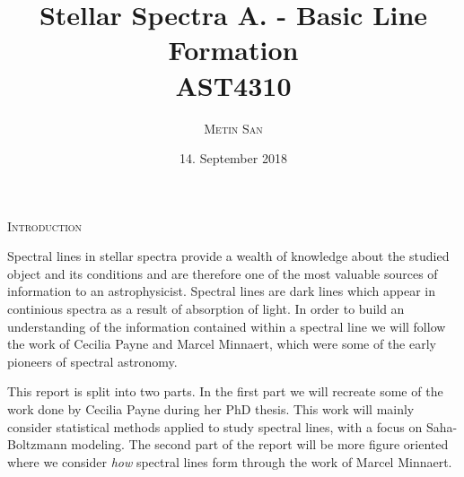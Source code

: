 \documentclass[a4paper,11.5pt,]{article}
\title{Stellar Spectra A. - Basic Line Formation\\
 AST4310}
\date{\normalsize{14. September 2018} }
\author{\textsc{\small{Metin San}}}
\begin{document}
\maketitle
\begin{center}
\textsc{Introduction}
\end{center}


\begin{adjustwidth}{1cm}{1cm}

Spectral lines in stellar spectra provide a wealth of knowledge about the studied object and its conditions and are therefore one of the most valuable sources of information to an astrophysicist. Spectral lines are dark lines which appear in continious spectra as a result of absorption of light. In order to build an understanding of the information contained within a spectral line we will follow the work of Cecilia Payne and Marcel Minnaert, which were some of the early pioneers of spectral astronomy. 

This report is split into two parts. In the first part we will recreate some of the work done by Cecilia Payne during her PhD thesis. This work will mainly consider statistical methods applied to study spectral lines, with a focus on Saha-Boltzmann modeling. The second part of the report will be more figure oriented where we consider \textit{how} spectral lines form through the work of Marcel Minnaert.
\end{adjustwidth}
\end{document}
